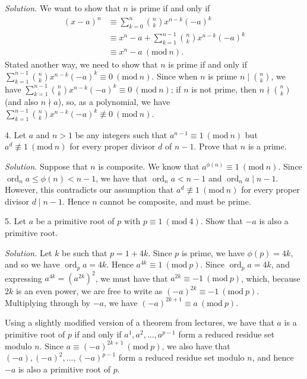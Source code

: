 \documentclass{article}
\newcommand{\Mod}[1]{\ (\mathrm{mod}\ #1)}
\DeclareMathOperator{\ord}{ord}
\begin{document}
\textit{Solution.}
We want to show that $n$ is prime if and only if
%
\begin{align*}
    (x - a)^n
        &\equiv \sum_{k = 0}^n \binom{n}{k} x^{n - k} (-a)^k \\
        &\equiv x^n - a + \sum_{k = 1}^{n - 1} \binom{n}{k} x^{n - k} (-a)^k \\
        &\equiv x^n - a
        \Mod{n}
        .
\end{align*}
%
Stated another way, we need to show that $n$ is prime if and only if
$\sum_{k = 1}^{n - 1} \binom{n}{k} x^{n - k} (-a)^k \equiv 0 \Mod{n}$.
Since when $n$ is prime $n \mid \binom{n}{k}$, we have
$\sum_{k = 1}^{n - 1} \binom{n}{k} x^{n - k} (-a)^k \equiv 0 \Mod{n}$;
if $n$ is not prime, then $n \nmid \binom{n}{k}$ (and also $n \nmid a$),
so, as a polynomial, we have
$\sum_{k = 1}^{n - 1} \binom{n}{k} x^{n - k} (-a)^k \not\equiv 0 \Mod{n}$.

\newpage

4. Let $a$ and $n > 1$ be any integers such that $a^{n - 1} \equiv 1 \Mod{n}$
but $a^d \not\equiv 1 \Mod{n}$ for every proper divisor $d$ of $n - 1$. Prove
that $n$ is a prime.

\textit{Solution.}
Suppose that $n$ is composite. We know that $a^{\phi(n)} \equiv 1 \Mod n$.
Since $\ord_{n} a \leq \phi(n) < n - 1$, we have that $\ord_{n} a < n - 1$
and $\ord_{n} a \mid n - 1$. However, this contradicts our assumption
that $a^d \not\equiv 1 \Mod{n}$ for every proper divisor $d \mid n - 1$.
Hence $n$ cannot be composite, and must be prime.

\newpage

5. Let $a$ be a primitive root of $p$ with $p \equiv 1 \Mod{4}$. Show
that $-a$ is also a primitive root.

\textit{Solution.}
Let $k$ be such that $p = 1 + 4k$. Since $p$ is prime, we have
$\phi(p) = 4k$, and so we have $\ord_{p} a = 4k$. Hence
$a^{4k} \equiv 1 \Mod{p}$. Since $\ord_{p} a = 4k$, and expressing
$a^{4k} = (a^{2k})^2$,  we must have that $a^{2k} \equiv - 1 \Mod{p}$,
which, because $2k$ is an even power, we are free to write as
$(-a)^{2k} \equiv - 1 \Mod{p}$. Multiplying through by $- a$, we have
$(-a)^{2k + 1} \equiv a \Mod{p}$.

Using a slightly modified version of a theorem from lectures, we have
that $a$ is a primitive root of $p$ if and only if
$a^1, a^2, \ldots, a^{p - 1}$ form a reduced residue set modulo $n$.
Since $a \equiv (-a)^{2k + 1} \Mod{p}$, we also have that
$(-a), (-a)^2, \ldots, (-a)^{p - 1}$ form a reduced residue set modulo
$n$, and hence $-a$ is also a primitive root of $p$.
\end{document}
